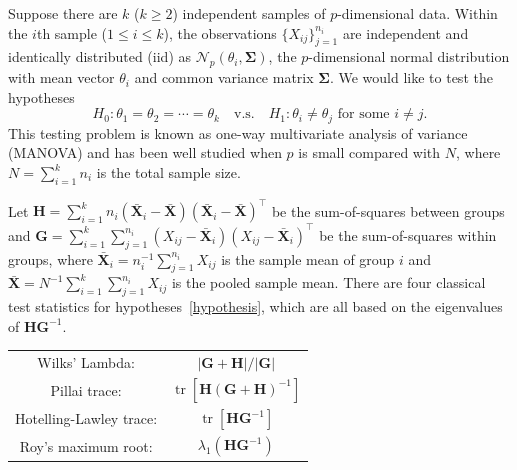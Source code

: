 \documentclass[12pt]{article} %
\DeclareMathOperator{\mytr}{tr}
\newcommand{\bX}{\mathbf{X}}
\newcommand{\bH}{\mathbf{H}}
\newcommand{\bG}{\mathbf{G}}
\newcommand{\bfsym}[1]{\ensuremath{\boldsymbol{#1}}}
\def\bSigma {\bfsym {\Sigma}}
\theoremstyle{definition}
\begin{document}
Suppose there are $k$ ($k\geq 2$) independent samples of $p$-dimensional data.
Within the $i$th sample ($1\leq i\leq k$), the observations $\{X_{ij}\}_{j=1}^{n_i}$ are independent and identically distributed (iid) as $\mathcal{N}_p(\theta_i,\bSigma)$, the $p$-dimensional normal distribution with mean vector $\theta_i$ and common variance matrix $\bSigma$.
We would like to test the hypotheses
\begin{equation}\label{hypothesis}
    H_0: \theta_1=\theta_2=\cdots=\theta_k\quad \text{v.s.}\quad　H_1: \text{$\theta_i\neq \theta_j$ for some $i\neq j$}.
\end{equation}
This testing problem is known as one-way multivariate analysis of variance (MANOVA) and has been well studied when $p$ is small compared with $N$, where $N=\sum_{i=1}^k n_i$ is the total sample size.

Let $\bH=\sum_{i=1}^k n_i (\bar{\bX}_i-\bar{\bX})(\bar{\bX}_i-\bar{\bX})^\top$ be the sum-of-squares between groups and $\bG=\sum_{i=1}^k \sum_{j=1}^{n_i}(X_{ij}-\bar{\bX}_i)(X_{ij}-\bar{\bX}_i)^\top$ be the sum-of-squares within groups, where $\bar{\bX}_i=n_i^{-1}\sum_{j=1}^{n_i}X_{ij}$ is the sample mean of group $i$ and $\bar{\bX}=N^{-1}\sum_{i=1}^k\sum_{j=1}^{n_i}X_{ij}$ is the pooled sample mean.
   There are four classical test statistics for hypotheses~\eqref{hypothesis}, which are all based on the eigenvalues of $\bH\bG^{-1}$. 


       \begin{center}
       \begin{tabular}{|cc|}
           \hline
       {Wilks' Lambda:} & $|\bG+\bH|/|\bG|$\\
       {Pillai trace:} & $\mytr[\bH(\bG+\bH)^{-1}]$\\
       {Hotelling-Lawley trace:} & $\mytr[\bH \bG^{-1}]$\\
       {Roy's maximum root:} & $\lambda_{1}(\bH \bG^{-1})$\\
           \hline
           \end{tabular}
       \end{center}
\end{document}
